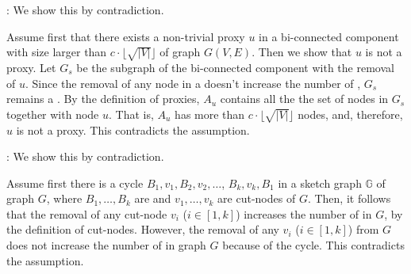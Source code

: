 : We show this by contradiction.

Assume first that there exists a non-trivial proxy $u$ in a bi-connected component with size larger than $c \cdot\lfloor\sqrt{|V|}\rfloor$ of graph $G(V, E)$.
Then we show that $u$ is not a proxy. Let $G_s$ be the subgraph of the bi-connected component with the removal of $u$. Since the removal of any node in a \bc doesn't increase the number of \ccs, $G_s$ remains a \cc. By the definition of proxies, $A_u$ contains all the  the set of nodes in $G_s$ together with node $u$. That is, $A_u$ has more than $c \cdot\lfloor\sqrt{|V|}\rfloor$ nodes, and, therefore, $u$ is not a proxy. This contradicts the assumption.
\eop


: We show this by contradiction.

Assume first there is a cycle $B_1, v_1, B_2, v_2, \ldots$, $B_k, v_k, B_1$ in a sketch graph $\mathbb{G}$ of graph $G$, where $B_1, \ldots, B_k$ are \bccs and $v_1, \ldots, v_k$ are cut-nodes of $G$. 
%
Then, it follows that the removal of any cut-node $v_i$ ($i\in[1, k]$) increases the number of \ccs in $G$, by the definition of cut-nodes.  However, the removal of any $v_i$ ($i\in[1, k]$) from $G$ does not increase the number of \ccs in graph $G$ because of the cycle.
This contradicts the assumption.
\eop
